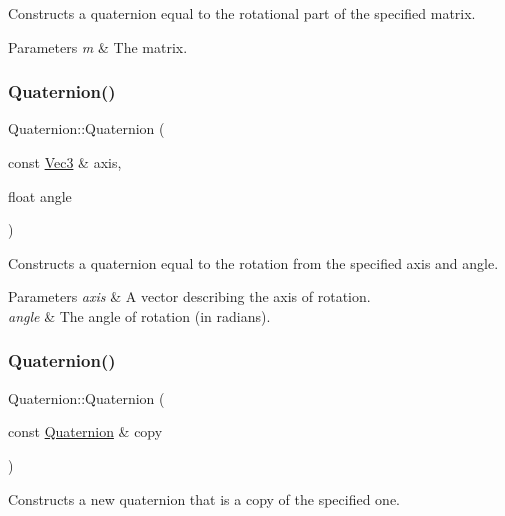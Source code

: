 Constructs a quaternion equal to the rotational part of the specified matrix.


\begin{DoxyParams}{Parameters}
{\em m} & The matrix. \\
\hline
\end{DoxyParams}
\mbox{\label{classQuaternion_a58c28df43d7a0624734db4635cb98182}} 
\subsubsection{\texorpdfstring{Quaternion()}{Quaternion()}\hspace{0.1cm}{\footnotesize\ttfamily [5/12]}}
{\footnotesize\ttfamily Quaternion\+::\+Quaternion (\begin{DoxyParamCaption}\item[{const \hyperlink{classVec3}{Vec3} \&}]{axis,  }\item[{float}]{angle }\end{DoxyParamCaption})}

Constructs a quaternion equal to the rotation from the specified axis and angle.


\begin{DoxyParams}{Parameters}
{\em axis} & A vector describing the axis of rotation. \\
\hline
{\em angle} & The angle of rotation (in radians). \\
\hline
\end{DoxyParams}
\mbox{\label{classQuaternion_aea3b87270ed824acf7250b2a94c4af8d}} 
\subsubsection{\texorpdfstring{Quaternion()}{Quaternion()}\hspace{0.1cm}{\footnotesize\ttfamily [6/12]}}
{\footnotesize\ttfamily Quaternion\+::\+Quaternion (\begin{DoxyParamCaption}\item[{const \hyperlink{classQuaternion}{Quaternion} \&}]{copy }\end{DoxyParamCaption})}

Constructs a new quaternion that is a copy of the specified one.


